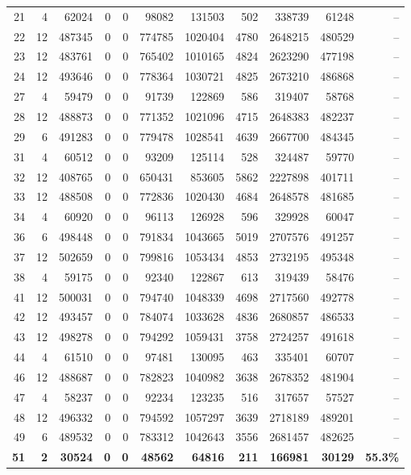 \documentclass[conference,twoside]{IEEEtran}
\begin{document}
\begin{table}[!htbp]
\begin{tabular}{rrrrrrrrrrr}
21 &  4 & 62024 & 0 & 0 & 98082 & 131503 & 502 & 338739 & 61248& -- \\
22 & 12  & 487345 & 0 & 0 & 774785 & 1020404 & 4780 & 2648215 & 480529& -- \\
23 &  12 & 483761 & 0 & 0 & 765402 & 1010165 & 4824 & 2623290 & 477198& -- \\
24 &  12 & 493646 & 0 & 0 & 778364 & 1030721 & 4825 & 2673210 & 486868& -- \\
27 & 4  & 59479 & 0 & 0 & 91739 & 122869 & 586 & 319407 & 58768& -- \\
28 &  12 & 488873 & 0 & 0 & 771352 & 1021096 & 4715 & 2648383 & 482237& -- \\
29 & 6  & 491283 & 0 & 0 & 779478 & 1028541 & 4639 & 2667700 & 484345& -- \\
31 &  4 & 60512 & 0 & 0 & 93209 & 125114 & 528 & 324487 & 59770& -- \\
32 & 12  & 408765 & 0 & 0 & 650431 & 853605 & 5862 & 2227898 & 401711& -- \\
33 &  12 & 488508 & 0 & 0 & 772836 & 1020430 & 4684 & 2648578 & 481685& -- \\
34 &  4 & 60920 & 0 & 0 & 96113 & 126928 & 596 & 329928 & 60047& -- \\
36 & 6  & 498448 & 0 & 0 & 791834 & 1043665 & 5019 & 2707576 & 491257& -- \\
37 & 12  & 502659 & 0 & 0 & 799816 & 1053434 & 4853 & 2732195 & 495348& -- \\
38 & 4  & 59175 & 0 & 0 & 92340 & 122867 & 613 & 319439 & 58476& -- \\
41 & 12  & 500031 & 0 & 0 & 794740 & 1048339 & 4698 & 2717560 & 492778& -- \\
42 & 12  & 493457 & 0 & 0 & 784074 & 1033628 & 4836 & 2680857 & 486533& -- \\
43 &  12 & 498278 & 0 & 0 & 794292 & 1059431 & 3758 & 2724257 & 491618& -- \\
44 & 4  & 61510 & 0 & 0 & 97481 & 130095 & 463 & 335401 & 60707& -- \\
46 &  12 & 488687 & 0 & 0 & 782823 & 1040982 & 3638 & 2678352 & 481904& -- \\
47 & 4  & 58237 & 0 & 0 & 92234 & 123235 & 516 & 317657 & 57527& -- \\
48 & 12  & 496332 & 0 & 0 & 794592 & 1057297 & 3639 & 2718189 & 489201& -- \\
49 & 6  & 489532 & 0 & 0 & 783312 & 1042643 & 3556 & 2681457 & 482625& -- \\
\textbf{51} & \textbf{2} & \textbf{30524} & \textbf{0} & \textbf{0} & \textbf{48562} & \textbf{64816} & \textbf{211} & \textbf{166981} & \textbf{30129} & \textbf{55.3\%} \\

\end{tabular}
\end{table}
\end{document}
